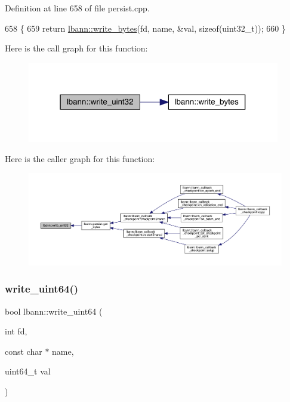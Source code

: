 Definition at line 658 of file persist.\+cpp.


\begin{DoxyCode}
658                                                                \{
659   \textcolor{keywordflow}{return} \hyperlink{namespacelbann_aed95061796f19fa1648dcc99dc335abd}{lbann::write\_bytes}(fd, name, &val, \textcolor{keyword}{sizeof}(uint32\_t));
660 \}
\end{DoxyCode}
Here is the call graph for this function\+:\nopagebreak
\begin{figure}[H]
\begin{center}
\leavevmode
\includegraphics[width=313pt]{namespacelbann_a3a801c9f48655f81b886af4bff083f27_cgraph}
\end{center}
\end{figure}
Here is the caller graph for this function\+:\nopagebreak
\begin{figure}[H]
\begin{center}
\leavevmode
\includegraphics[width=350pt]{namespacelbann_a3a801c9f48655f81b886af4bff083f27_icgraph}
\end{center}
\end{figure}
\mbox{\label{namespacelbann_a234f8c7b9bbc2d9310d3e40314eb497c}} 
\subsubsection{\texorpdfstring{write\+\_\+uint64()}{write\_uint64()}}
{\footnotesize\ttfamily bool lbann\+::write\+\_\+uint64 (\begin{DoxyParamCaption}\item[{int}]{fd,  }\item[{const char $\ast$}]{name,  }\item[{uint64\+\_\+t}]{val }\end{DoxyParamCaption})}



